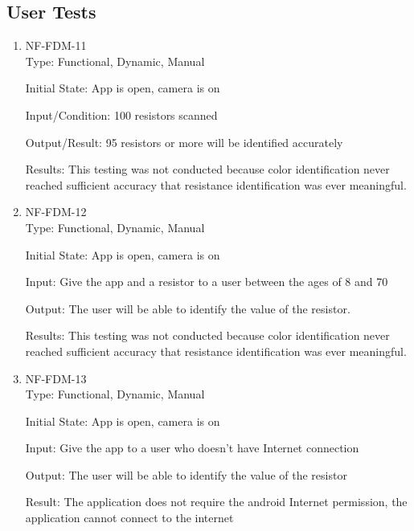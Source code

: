 \documentclass[12pt, titlepage]{article}
\begin{document}
\subsection{User Tests}
\begin{enumerate}
\item{NF-FDM-11\\}
Type: Functional, Dynamic, Manual
					
Initial State: 
App is open, camera is on
					
Input/Condition: 
100 resistors scanned
					
Output/Result: 
95 resistors or more will be identified accurately
					
Results:
This testing was not conducted because color identification never reached sufficient accuracy that resistance identification was ever meaningful.
					
\item{NF-FDM-12\\}
Type: Functional, Dynamic, Manual
					
Initial State: 
App is open, camera is on
					
Input: 
Give the app and a resistor to a user between the ages of 8 and 70
					
Output: 
The user will be able to identify the value of the resistor.
					
Results:
This testing was not conducted because color identification never reached sufficient accuracy that resistance identification was ever meaningful.

\item{NF-FDM-13\\}
Type: Functional, Dynamic, Manual
					
Initial State: 
App is open, camera is on
					
Input: 
Give the app to a user who doesn't have Internet connection
					
Output: 
The user will be able to identify the value of the resistor
					
Result:
The application does not require the android Internet permission, the application cannot connect to the internet

\end{enumerate}
\end{document}
